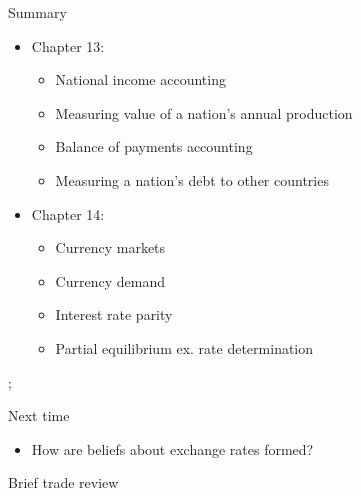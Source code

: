 \documentclass{beamer}
\begin{document}
\begin{frame}{Summary}
    \begin{itemize}
        \item Chapter 13:
        \begin{itemize}
            \item National income accounting
            \item Measuring value of a nation's annual production
            \item Balance of payments accounting
            \item Measuring a nation's debt to other countries
        \end{itemize}
        \item Chapter 14:
        \begin{itemize}
        \item Currency markets
        \item Currency demand
        \item Interest rate parity
        \item Partial equilibrium ex. rate determination
        \end{itemize}
    \end{itemize};
\end{frame}

\begin{frame}{Next time}
    \begin{itemize}
        \item How are beliefs about exchange rates formed?
    \end{itemize}
\end{frame}

\begin{frame}{Brief trade review}

\end{frame}
\end{document}
